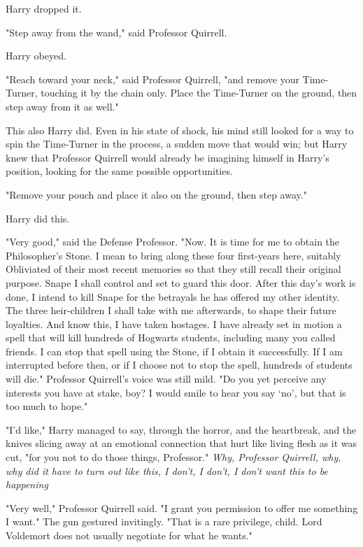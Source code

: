 Harry dropped it.

"Step away from the wand," said Professor Quirrell.

Harry obeyed.

"Reach toward your neck," said Professor Quirrell, "and remove your
Time-Turner, touching it by the chain only. Place the Time-Turner on the
ground, then step away from it as well."

This also Harry did. Even in his state of shock, his mind still looked for a
way to spin the Time-Turner in the process, a sudden move that would win; but
Harry knew that Professor Quirrell would already be imagining himself in
Harry's position, looking for the same possible opportunities.

"Remove your pouch and place it also on the ground, then step away."

Harry did this.

"Very good," said the Defense Professor. "Now. It is time for me to obtain the
Philosopher's Stone. I mean to bring along these four first-years here,
suitably Obliviated of their most recent memories so that they still recall
their original purpose. Snape I shall control and set to guard this door. After
this day's work is done, I intend to kill Snape for the betrayals he has
offered my other identity. The three heir-children I shall take with me
afterwards, to shape their future loyalties. And know this, I have taken
hostages. I have already set in motion a spell that will kill hundreds of
Hogwarts students, including many you called friends. I can stop that spell
using the Stone, if I obtain it successfully. If I am interrupted before then,
or if I choose not to stop the spell, hundreds of students will die." Professor
Quirrell's voice was still mild. "Do you yet perceive any interests you have at
stake, boy? I would smile to hear you say `no', but that is too much to hope."

"I'd like," Harry managed to say, through the horror, and the heartbreak, and
the knives slicing away at an emotional connection that hurt like living flesh
as it was cut, "for you not to do those things, Professor." \emph{Why,
Professor Quirrell, why, why did it have to turn out like this, I don't, I
don't, I don't want this to be happening{\el}}

"Very well," Professor Quirrell said. "I grant you permission to offer me
something I want." The gun gestured invitingly. "That is a rare privilege,
child. Lord Voldemort does not usually negotiate for what he wants."

